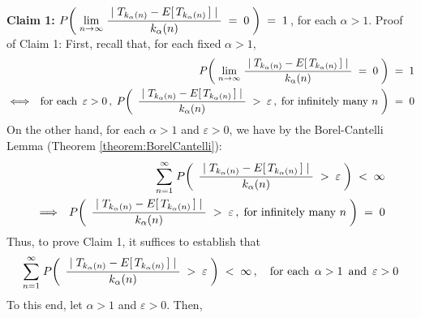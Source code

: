 \begin{enumerate}
\vskip 0.5cm
\noindent
\textbf{Claim 1:}\quad\quad
$P\!\left(\;
	\underset{n\rightarrow\infty}{\lim}\;
		\dfrac{{\color{white}.}\vert\;T_{k_{\alpha}(n)} - E[\,T_{k_{\alpha}(n)}\,]\;\vert{\color{white}.}}{k_{\alpha}(n)}
	\;=\;0
	\;\right)
\;=\;1$\,, for each $\alpha > 1$.
\vskip 0.3cm
\noindent
Proof of Claim 1:\quad
First, recall that, for each fixed $\alpha > 1$,
\begin{eqnarray*}
&&
	P\!\left(\;
	\underset{n\rightarrow\infty}{\lim}\;
		\dfrac{{\color{white}.}\vert\;T_{k_{\alpha}(n)} - E[\,T_{k_{\alpha}(n)}\,]\;\vert{\color{white}.}}{k_{\alpha}(n)}
	\;=\;0
	\;\right)
	\;=\;1
\\
&\Longleftrightarrow&
	\textnormal{for each \,$\varepsilon > 0$}\,,\;
	P\!\left(\;\,
		\dfrac{{\color{white}.}\vert\;T_{k_{\alpha}(n)} - E[\,T_{k_{\alpha}(n)}\,]\;\vert{\color{white}.}}{k_{\alpha}(n)}
		\;>\;\varepsilon\,,\;\textnormal{for infinitely many $n$}
		\;\right)
	\;=\;0
\end{eqnarray*}
On the other hand, for each $\alpha > 1$ and $\varepsilon > 0$, we have by
the Borel-Cantelli Lemma (Theorem \ref{theorem:BorelCantelli}):
\begin{eqnarray*}
&&
	\overset{\infty}{\underset{n=1}{\sum}}\;
		P\!\left(\;\,
			\dfrac{{\color{white}.}\vert\;T_{k_{\alpha}(n)} - E[\,T_{k_{\alpha}(n)}\,]\;\vert{\color{white}.}}{k_{\alpha}(n)}
			\;>\;\varepsilon
			\;\right)
	\;<\; \infty
\\
&\Longrightarrow&
	P\!\left(\;\,
		\dfrac{{\color{white}.}\vert\;T_{k_{\alpha}(n)} - E[\,T_{k_{\alpha}(n)}\,]\;\vert{\color{white}.}}{k_{\alpha}(n)}
		\;>\;\varepsilon\,,\;\textnormal{for infinitely many $n$}
		\;\right)
	\;=\;0
\end{eqnarray*}
Thus, to prove Claim 1, it suffices to establish that
\begin{equation*}
\overset{\infty}{\underset{n=1}{\sum}}\;
	P\!\left(\;\,
		\dfrac{{\color{white}.}\vert\;T_{k_{\alpha}(n)} - E[\,T_{k_{\alpha}(n)}\,]\;\vert{\color{white}.}}{k_{\alpha}(n)}
		\;>\;\varepsilon
		\;\right)
\;<\; \infty\,,
\quad\textnormal{for each \,$\alpha > 1$\, and \,$\varepsilon > 0$}
\end{equation*}
To this end, let $\alpha > 1$ and $\varepsilon > 0$. Then,

\end{enumerate}
